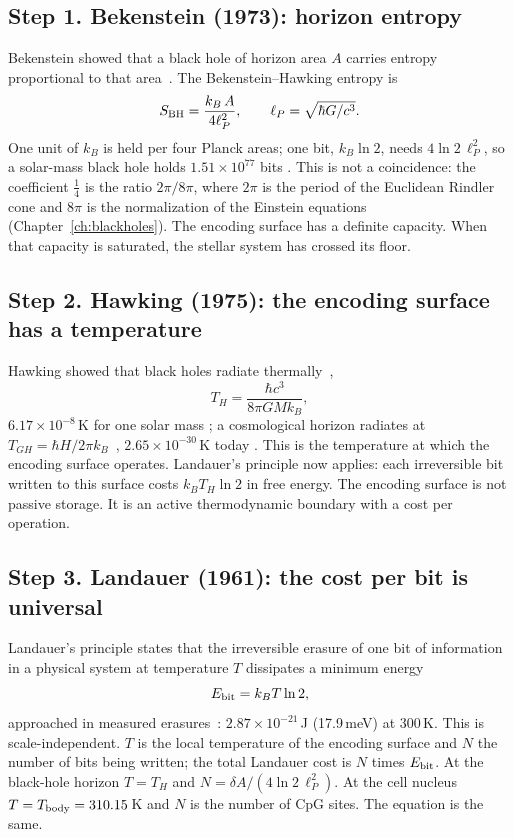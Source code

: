 \subsection*{Step 1. Bekenstein (1973): horizon entropy}
Bekenstein showed that a black hole of horizon area $A$ carries entropy proportional to that area~\cite{Bekenstein1973}. The Bekenstein--Hawking
entropy is
\begin{equation}
  S_{\rm BH}=\frac{k_B\,A}{4\ell_P^2},\qquad \ell_P=\sqrt{\hbar G/c^3}.
\end{equation}
One unit of $k_B$ is held per four Planck areas; one bit, $k_B\ln2$, needs $4\ln2\,\ell_P^2$, so a solar-mass black hole holds
$1.51\times10^{77}$ bits \calc. This is not a coincidence: the coefficient $\tfrac14$ is the ratio $2\pi/8\pi$, where $2\pi$ is the period of the Euclidean
Rindler cone and $8\pi$ is the normalization of the Einstein equations (Chapter~\ref{ch:blackholes}). \derived{} The encoding surface has a definite
capacity. When that capacity is saturated, the stellar system has crossed its floor.

\subsection*{Step 2. Hawking (1975): the encoding surface has a temperature}
Hawking showed that black holes radiate thermally~\cite{Hawking1975},
\begin{equation}
  T_H=\frac{\hbar c^3}{8\pi GMk_B},
\end{equation}
$6.17\times10^{-8}$\,K for one solar mass \calc; a cosmological horizon radiates at $T_{GH}=\hbar H/2\pi k_B$~\cite{GibbonsHawking1977},
$2.65\times10^{-30}$\,K today \calc. This is the temperature at which the encoding surface operates. Landauer's principle now applies: each irreversible
bit written to this surface costs $k_BT_H\ln2$ in free energy. The encoding surface is not passive storage. It is an active thermodynamic boundary
with a cost per operation.

\subsection*{Step 3. Landauer (1961): the cost per bit is universal}
Landauer's principle states that the irreversible erasure of one bit of information in a physical system at temperature $T$ dissipates a minimum
energy~\cite{Landauer1961,Bennett1982}
\begin{equation}
  E_{\rm bit}=k_BT\ln2 ,
\end{equation}
approached in measured erasures~\cite{Berut2012}: $2.87\times10^{-21}$\,J (17.9\,meV) at 300\,K. \observed{} This is scale-independent. $T$ is the local
temperature of the encoding surface and $N$ the number of bits being written; the total Landauer cost is $N$ times $E_{\rm bit}$. At the black-hole
horizon $T=T_H$ and $N=\delta A/(4\ln2\,\ell_P^2)$. At the cell nucleus $T=T_{\rm body}=310.15$\,K and $N$ is the number of CpG sites. The equation
is the same.

